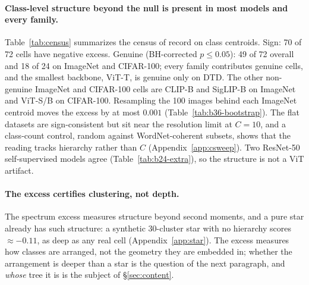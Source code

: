 \documentclass{article}
\begin{document}
\paragraph{Class-level structure beyond the null is present in most models and every family.} Table~\ref{tab:census} summarizes the census of record on class centroids. Sign: 70 of 72 cells have negative excess. Genuine (BH-corrected $p\le0.05$): 49 of 72 overall and 18 of 24 on ImageNet and CIFAR-100; every family contributes genuine cells, and the smallest backbone, ViT-T, is genuine only on DTD. The other non-genuine ImageNet and CIFAR-100 cells are CLIP-B and SigLIP-B on ImageNet and ViT-S/B on CIFAR-100. Resampling the 100 images behind each ImageNet centroid moves the excess by at most $0.001$ (Table~\ref{tab:b36-bootstrap}). The flat datasets are sign-consistent but sit near the resolution limit at $C{=}10$, and a class-count control, random against WordNet-coherent subsets, shows that the reading tracks hierarchy rather than $C$ (Appendix~\ref{app:csweep}). Two ResNet-50 self-supervised models agree (Table~\ref{tab:b24-extra}), so the structure is not a ViT artifact. %

\paragraph{The excess certifies clustering, not depth.} The spectrum excess measures structure beyond second moments, and a pure star already has such structure: a synthetic 30-cluster star with no hierarchy scores $\approx-0.11$, as deep as any real cell (Appendix~\ref{app:star}). The excess measures how classes are arranged, not the geometry they are embedded in; whether the arrangement is deeper than a star is the question of the next paragraph, and \emph{whose} tree it is is the subject of \S\ref{sec:content}. %
\end{document}
